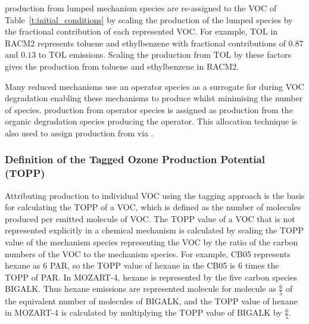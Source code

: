  production from lumped mechanism species are re-assigned to the VOC of \mbox{Table \ref{t:initial_conditions}} by scaling the  production of the lumped species by the fractional contribution of each represented VOC.
For example, TOL in RACM2 represents toluene and ethylbenzene with fractional contributions of $0.87$ and $0.13$ to TOL emissions.
Scaling the  production from TOL by these factors gives the  production from toluene and ethylbenzene in RACM2.

Many reduced mechanisms use an operator species as a surrogate for  during VOC degradation enabling these mechanisms to produce  whilst minimising the number of  species.
 production from operator species is assigned as  production from the organic degradation species producing the operator.
This allocation technique is also used to assign  production from  via .
%
\subsubsection{Definition of the Tagged Ozone Production Potential (TOPP)} \label{sss:TOPP} %
%
Attributing  production to individual VOC using the tagging approach is the basis for calculating the TOPP of a VOC, which is defined as the number of  molecules produced per emitted molecule of VOC.
The TOPP value of a VOC that is not represented explicitly in a chemical mechanism is calculated by scaling the TOPP value of the mechanism species representing the VOC by the ratio of the carbon numbers of the VOC to the mechanism species.
For example, CB05 represents hexane as $6$ PAR, so the TOPP value of hexane in the CB05 is $6$ times the TOPP of PAR.
In MOZART-4, hexane is represented by the five carbon species BIGALK.
Thus hexane emissions are represented molecule for molecule as $\frac{6}{5}$ of the equivalent number of molecules of BIGALK, and the TOPP value of hexane in MOZART-4 is calculated by multiplying the TOPP value of BIGALK by $\frac{6}{5}$.
